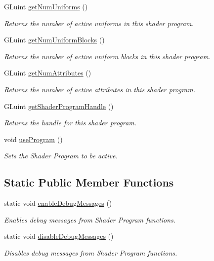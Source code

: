 \begin{DoxyCompactItemize}
G\+Luint \hyperlink{class_c_s_c_i441_1_1_shader_program_aa47d813096eba4588d0641e247144376}{get\+Num\+Uniforms} ()
\begin{DoxyCompactList}\small\item\em Returns the number of active uniforms in this shader program. \end{DoxyCompactList}\item 
G\+Luint \hyperlink{class_c_s_c_i441_1_1_shader_program_a1bc6aedd8b3dc76439717a070aeb4586}{get\+Num\+Uniform\+Blocks} ()
\begin{DoxyCompactList}\small\item\em Returns the number of active uniform blocks in this shader program. \end{DoxyCompactList}\item 
G\+Luint \hyperlink{class_c_s_c_i441_1_1_shader_program_a4b76efbf04fb2ce32f85ba5a7333eb62}{get\+Num\+Attributes} ()
\begin{DoxyCompactList}\small\item\em Returns the number of active attributes in this shader program. \end{DoxyCompactList}\item 
G\+Luint \hyperlink{class_c_s_c_i441_1_1_shader_program_aa1003cd55af666853561d97fac94b92b}{get\+Shader\+Program\+Handle} ()
\begin{DoxyCompactList}\small\item\em Returns the handle for this shader program. \end{DoxyCompactList}\item 
\mbox{\label{class_c_s_c_i441_1_1_shader_program_a860673d457ffcc7495d573289a3dc557}} 
void \hyperlink{class_c_s_c_i441_1_1_shader_program_a860673d457ffcc7495d573289a3dc557}{use\+Program} ()
\begin{DoxyCompactList}\small\item\em Sets the Shader Program to be active. \end{DoxyCompactList}\end{DoxyCompactItemize}
\subsection*{Static Public Member Functions}
\begin{DoxyCompactItemize}
\item 
static void \hyperlink{class_c_s_c_i441_1_1_shader_program_aa7cf75ce6605ac1f6ca660f98b88ebba}{enable\+Debug\+Messages} ()
\begin{DoxyCompactList}\small\item\em Enables debug messages from Shader Program functions. \end{DoxyCompactList}\item 
static void \hyperlink{class_c_s_c_i441_1_1_shader_program_a9358a3f05e8432707d8ec89d1cd9d248}{disable\+Debug\+Messages} ()
\begin{DoxyCompactList}\small\item\em Disables debug messages from Shader Program functions. \end{DoxyCompactList}\end{DoxyCompactItemize}


